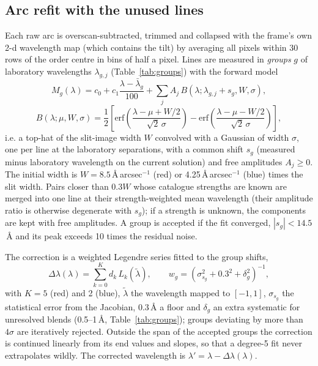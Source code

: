 \subsection{Arc refit with the unused lines}
\label{sec:wl_refit}
Each raw arc is overscan-subtracted, trimmed and collapsed with the frame's own 2-d wavelength map (which contains
the tilt) by averaging all pixels within 30 rows of the order centre in bins of half a pixel. Lines are measured in
\emph{groups} $g$ of laboratory wavelengths $\lambda_{g,j}$ (Table~\ref{tab:groups}) with the forward model
\begin{equation}
M_g(\lambda) = c_0 + c_1\frac{\lambda-\bar\lambda_g}{100} + \sum_j A_j\,B(\lambda;\lambda_{g,j}+s_g,W,\sigma),
\label{eq:arcgroup}
\end{equation}
\begin{equation}
B(\lambda;\mu,W,\sigma)=\frac{1}{2}\left[\mathrm{erf}\!\left(\frac{\lambda-\mu+W/2}{\sqrt2\,\sigma}\right)
 -\mathrm{erf}\!\left(\frac{\lambda-\mu-W/2}{\sqrt2\,\sigma}\right)\right],
\label{eq:boxcar}
\end{equation}
i.e. a top-hat of the slit-image width $W$ convolved with a Gaussian of width $\sigma$, one per line at the
laboratory separations, with a common shift $s_g$ (measured minus laboratory wavelength on the current solution)
and free amplitudes $A_j\ge0$. The initial width is $W=8.5$\,\AA\,arcsec$^{-1}$ (red) or
4.25\,\AA\,arcsec$^{-1}$ (blue) times the slit width. Pairs closer than $0.3W$ whose catalogue strengths are known
are merged into one line at their strength-weighted mean wavelength (their amplitude ratio is otherwise degenerate
with $s_g$); if a strength is unknown, the components are kept with free amplitudes. A group is accepted if the fit
converged, $|s_g|<14.5$\,\AA{} and its peak exceeds 10 times the residual noise.

The correction is a weighted Legendre series fitted to the group shifts,
\begin{equation}
\Delta\lambda(\lambda)=\sum_{k=0}^{K}d_k\,L_k(\tilde\lambda),\qquad
w_g = \left(\sigma_{s_g}^2+0.3^2+\delta_g^2\right)^{-1},
\label{eq:arccorr}
\end{equation}
with $K=5$ (red) and 2 (blue), $\tilde\lambda$ the wavelength mapped to $[-1,1]$, $\sigma_{s_g}$ the statistical error
from the Jacobian, 0.3\,\AA{} a floor and $\delta_g$ an extra systematic for unresolved blends (0.5--1\,\AA{},
Table~\ref{tab:groups}); groups deviating by more than $4\sigma$ are iteratively rejected. Outside the span of
the accepted groups the correction is continued linearly from its end values and slopes, so that a degree-5 fit never
extrapolates wildly. The corrected wavelength is $\lambda'=\lambda-\Delta\lambda(\lambda)$.

